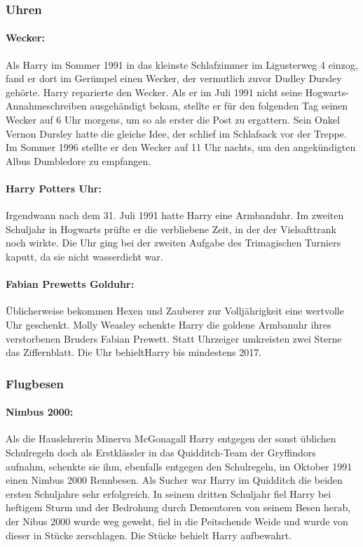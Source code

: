 \documentclass[a4paper, 10pt]{article}
\begin{document}
\subsubsection*{\large Uhren}
\paragraph{Wecker:}
Als Harry im Sommer 1991 in das kleinste Schlafzimmer im Ligusterweg 4 einzog, fand er dort im Gerümpel einen Wecker, der vermutlich zuvor Dudley Dursley gehörte. Harry reparierte den Wecker. Als er im Juli 1991 nicht seine Hogwarts-Annahmeschreiben ausgehändigt bekam, stellte er für den folgenden Tag seinen Wecker auf 6 Uhr morgens, um so als erster die Post zu ergattern. Sein Onkel Vernon Dursley hatte die gleiche Idee, der schlief im Schlafsack vor der Treppe. Im Sommer 1996 stellte er den Wecker auf 11 Uhr nachts, um den angekündigten Albus Dumbledore zu empfangen.
\paragraph{Harry Potters Uhr:}
Irgendwann nach dem 31. Juli 1991 hatte Harry eine Armbanduhr. Im zweiten Schuljahr in Hogwarts prüfte er die verbliebene Zeit, in der der Vielsafttrank noch wirkte. Die Uhr ging bei der zweiten Aufgabe des Trimagischen Turniers kaputt, da sie nicht wasserdicht war.
\paragraph{Fabian Prewetts Golduhr:}
Üblicherweise bekommen Hexen und Zauberer zur Volljährigkeit eine wertvolle Uhr geschenkt. Molly Weasley schenkte Harry die goldene Armbanuhr ihres verstorbenen Bruders Fabian Prewett. Statt Uhrzeiger umkreisten zwei Sterne das Ziffernblatt. Die Uhr behieltHarry bis mindestens 2017.

\subsubsection*{\large Flugbesen}
\paragraph{Nimbus 2000:}
Als die Hauslehrerin Minerva McGonagall Harry entgegen der sonst üblichen Schulregeln doch als Erstklässler in das Quidditch-Team der Gryffindors aufnahm, schenkte sie ihm, ebenfalls entgegen den Schulregeln, im Oktober 1991 einen Nimbus 2000 Rennbesen. Als Sucher war Harry im Quidditch die beiden ersten Schuljahre sehr erfolgreich. In seinem dritten Schuljahr fiel Harry bei heftigem Sturm und der Bedrohung durch Dementoren von seinem Besen herab, der Nibus 2000 wurde weg geweht, fiel in die Peitschende Weide und wurde von dieser in Stücke zerschlagen. Die Stücke behielt Harry aufbewahrt.
\end{document}
